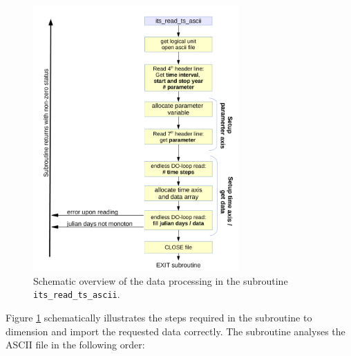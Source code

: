 \documentclass[11pt,twoside]{report}
\begin{document}
\begin{figure}
\includegraphics[width=0.7\textwidth]{TS_read_ASCII.pdf}
\caption{Schematic overview of the data processing in the subroutine
{\tt its\_read\_ts\_ascii}\label{fig:TSreadascii}.}
\end{figure}
Figure \ref{fig:TSreadascii} schematically illustrates  the steps
required in the subroutine to dimension and import the requested data
correctly. The subroutine analyses the ASCII
file in the following order: 
\end{document}
